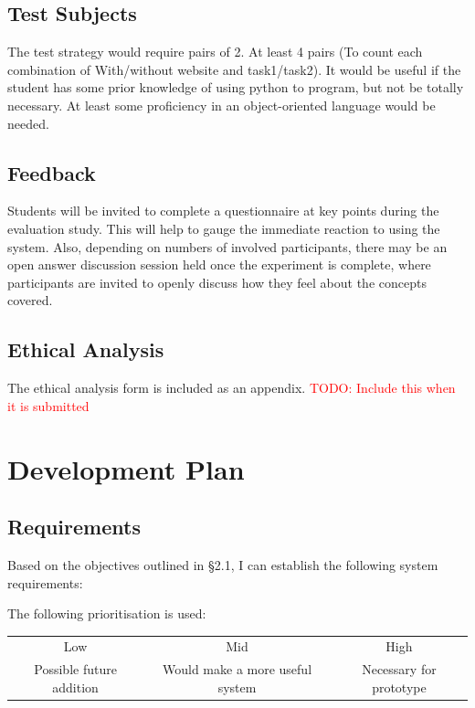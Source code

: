 \documentclass[a4paper,11pt]{report}
\newcommand{\todo}[1]{\textcolor{red}{TODO: #1}}
\begin{document}
\section{Test Subjects}
The test strategy would require pairs of 2. At least 4 pairs (To count each combination of With/without website and task1/task2). It would be useful if the student has some prior knowledge of using python to program, but not be totally necessary. At least some proficiency in an object-oriented language would be needed.

\section{Feedback}
Students will be invited to complete a questionnaire at key points during the evaluation study. This will help to gauge the immediate reaction to using the system. Also, depending on numbers of involved participants, there may be an open answer discussion session held once the experiment is complete, where participants are invited to openly discuss how they feel about the concepts covered.

\section{Ethical Analysis}
The ethical analysis form is included as an appendix. \todo{Include this when it is submitted}



\chapter{Development Plan}

\section{Requirements}
Based on the objectives outlined in \S 2.1, I can establish the following system requirements:\par
The following prioritisation is used:\\
\begin{tabular}{ccc}
 Low & Mid & High\\
 Possible future addition & Would make a more useful system & Necessary for prototype
\end{tabular}
\end{document}
